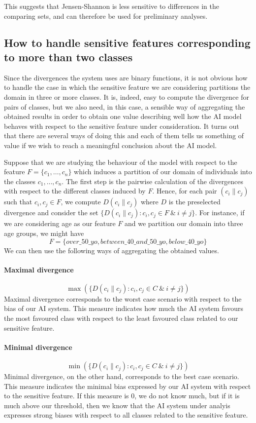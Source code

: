 \documentclass[
]{ceurart}
\begin{document}
This suggests that Jensen-Shannon is less sensitive to differences in the comparing sets, and can therefore be used for preliminary analyses.

\subsection{How to handle sensitive features corresponding to more than two classes}
Since the divergences the system uses are binary functions, it is not obvious how to handle the case in which the sensitive feature we are considering partitions the domain in three or more classes. It is, indeed, easy to compute the divergence for pairs of classes, but we also need, in this case, a sensible way of aggregating the obtained results in order to obtain one value describing well how the AI model behaves with respect to the sensitive feature under consideration. It turns out that there are several ways of doing this and each of them tells us something of value if we wish to reach a meaningful conclusion about the AI model.

Suppose that we are studying the behaviour of the model with respect to the feature $F=\{c_1, \ldots , c_n\}$ which induces a partition of our domain of individuals into the classes $c_1, \ldots , c_n$. The first step is the pairwise calculation of the divergences with respect to the different classes induced by $F$. Hence, for each pair $(c_i\parallel c_j)$ such that $c_i, c_j\in F$, we compute $D(c_i\parallel c_j) $ where $D$ is the  preselected divergence and consider the set $\{D(c_i\parallel c_j) : c_i,c_j\in F\ \&\ i\neq j\}$. For instance, if we are considering age as our feature  $F$ and we partition our domain into three age groups, we might have
\[F=\{over\_50\_yo, between\_40\_and\_50\_yo, below\_40\_yo\}\]
We can then use the following ways of aggregating the obtained values.

\paragraph{Maximal divergence}

$$\max (\{D(c_i\parallel c_j): c_i,c_j\in C\ \&\ i\neq j\})$$
Maximal divergence corresponds to the worst case scenario with respect to the bias of our AI system. This measure indicates how much the AI system favours the most favoured class with respect to the least favoured class related to our sensitive feature.

\paragraph{Minimal divergence}
$$\min (\{D(c_i\parallel c_j): c_i,c_j\in C\ \&\ i\neq j\})$$
Minimal divergence, on the other hand, corresponds to the best case scenario.  This measure indicates the minimal bias expressed by our AI system with respect to the sensitive feature. If this measure is $0$, we do not know much, but if it is much above our threshold, then we know that the AI system under analyis expresses strong biases with respect to all classes related to the sensitive feature.
\end{document}
